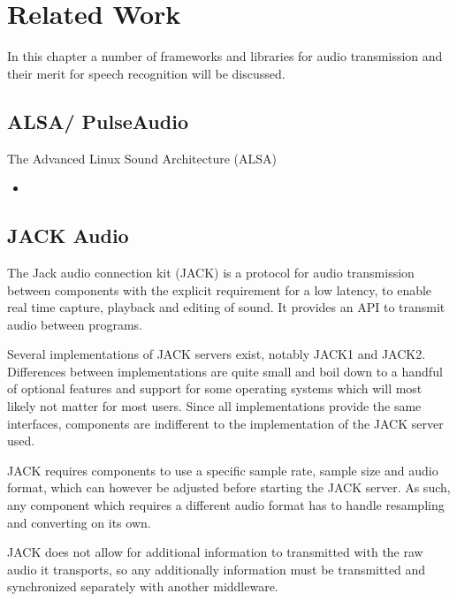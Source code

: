 
\chapter{Related Work}

In this chapter a number of frameworks and libraries for audio transmission and their merit for speech recognition will be discussed.

\section{ALSA/ PulseAudio}
The Advanced Linux Sound Architecture (ALSA) 

\begin{itemize}
	\item 
\end{itemize}

\section{JACK Audio}

The Jack audio connection kit (JACK) is a protocol for audio transmission between components with the explicit requirement for a low latency, to enable real time capture, playback and editing of sound. 
It provides an API to transmit audio between programs.

Several implementations of JACK servers exist, notably JACK1 and JACK2. 
Differences between implementations are quite small and boil down to a handful of optional features and support for some operating systems which will most likely not matter for most users. %
Since all implementations provide the same interfaces, components are indifferent to the implementation of the JACK server used. 

JACK requires components to use a specific sample rate, sample size and audio format, which can however be adjusted before starting the JACK server. 
As such, any component which requires a different audio format has to handle resampling and converting on its own. 

JACK does not allow for additional information to transmitted with the raw audio it transports, so any additionally information must be transmitted and synchronized separately with another middleware. 

